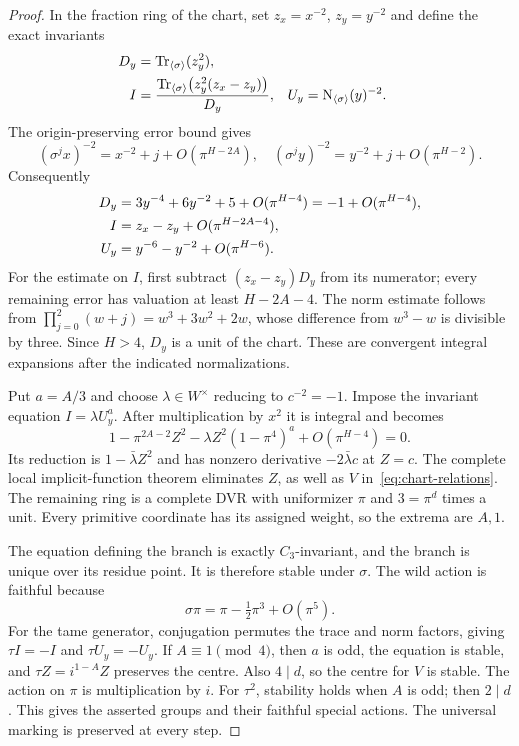 \begin{proof}
In the fraction ring of the chart, set $z_x=x^{-2}$, $z_y=y^{-2}$ and define the exact invariants
\begin{align}
 D_y&=\operatorname{Tr}_{\langle\sigma\rangle}(z_y^2),\notag\\
 I&=\frac{\operatorname{Tr}_{\langle\sigma\rangle}\bigl(z_y^2(z_x-z_y)\bigr)}{D_y},
 &U_y&=\operatorname{N}_{\langle\sigma\rangle}(y)^{-2}.
 \label{eq:trace-invariants}
\end{align}
The origin-preserving error bound gives
\[
 (\sigma^j x)^{-2}=x^{-2}+j+O(\pi^{H-2A}),\quad
 (\sigma^j y)^{-2}=y^{-2}+j+O(\pi^{H-2}).
\]
Consequently
\begin{align}
 D_y&=3y^{-4}+6y^{-2}+5+O(\pi^{H-4})
       =-1+O(\pi^{H-4}),\notag\\
 I&=z_x-z_y+O(\pi^{H-2A-4}),\notag\\
 U_y&=y^{-6}-y^{-2}+O(\pi^{H-6}).
 \label{eq:invariant-expansions}
\end{align}
For the estimate on $I$, first subtract $(z_x-z_y)D_y$ from its numerator; every remaining error has valuation at least $H-2A-4$. The norm estimate follows from
$\prod_{j=0}^2(w+j)=w^3+3w^2+2w$, whose difference from $w^3-w$ is divisible by three. Since $H>4$, $D_y$ is a unit of the chart. These are convergent integral expansions after the indicated normalizations.

Put $a=A/3$ and choose $\lambda\in W^\times$ reducing to $c^{-2}=-1$. Impose the invariant equation $I=\lambda U_y^a$. After multiplication by $x^2$ it is integral and becomes
\begin{equation}\label{eq:simple-branch}
 1-\pi^{2A-2}Z^2-\lambda Z^2(1-\pi^4)^a
                         +O(\pi^{H-4})=0.
\end{equation}
Its reduction is $1-\bar\lambda Z^2$ and has nonzero derivative $-2\bar\lambda c$ at $Z=c$. The complete local implicit-function theorem eliminates $Z$, as well as $V$ in~\eqref{eq:chart-relations}. The remaining ring is a complete DVR with uniformizer $\pi$ and $3=\pi^d$ times a unit. Every primitive coordinate has its assigned weight, so the extrema are $A,1$.

The equation defining the branch is exactly $C_3$-invariant, and the branch is unique over its residue point. It is therefore stable under $\sigma$. The wild action is faithful because
\[
 \sigma\pi=\pi-\tfrac12\pi^3+O(\pi^5).
\]
For the tame generator, conjugation permutes the trace and norm factors, giving $\tau I=-I$ and $\tau U_y=-U_y$. If $A\equiv1\pmod4$, then $a$ is odd, the equation is stable, and $\tau Z=i^{1-A}Z$ preserves the centre. Also $4\mid d$, so the centre for $V$ is stable. The action on $\pi$ is multiplication by $i$. For $\tau^2$, stability holds when $A$ is odd; then $2\mid d$. This gives the asserted groups and their faithful special actions. The universal marking is preserved at every step.
\end{proof}

